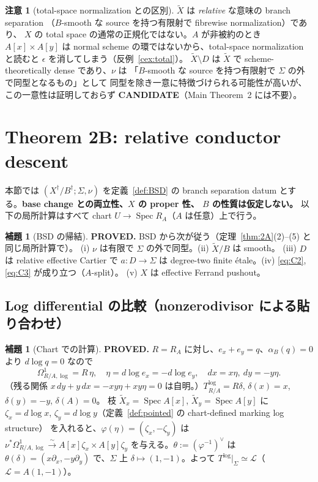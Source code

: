 \documentclass[11pt,a4paper]{article}
\numberwithin{equation}{section}
\theoremstyle{definition}
\newtheorem{lemma}[definition]{補題}
\newtheorem{remark}[definition]{注意}
\newcommand{\tX}{\widetilde X}
\newcommand{\LL}{\mathcal L}
\begin{document}
\begin{remark}[total-space normalization との区別]\label{rem:not-total-norm}
$\tX$ は \emph{relative} な意味の branch separation
（$B$-smooth な source を持つ有限射で fibrewise normalization）であり、
$X$ の total space の通常の正規化ではない。$A$ が非被約のとき
$A[x]\times A[y]$ は normal scheme の環ではないから、total-space
normalization と読むと $\epsilon$ を消してしまう（反例~\ref{cex:total}）。
\(\tX\setminus D\) は $\tX$ で scheme-theoretically dense であり、$\nu$ は
「$B$-smooth な source を持つ有限射で $\Sigma$ の外で同型となるもの」として
同型を除き一意に特徴づけられる可能性が高いが、この一意性は証明しておらず
\textbf{CANDIDATE}（Main Theorem~2 には不要）。
\end{remark}

\section{Theorem 2B: relative conductor descent}\label{sec:2B}

本節では \((X^\dagger/B^\dagger;\Sigma,\nu)\) を定義~\ref{def:BSD} の
branch separation datum とする。\textbf{base change との両立性、$X$ の proper 性、
$B$ の性質は仮定しない。} 以下の局所計算はすべて chart
$U\to\operatorname{Spec}R_A$（$A$ は任意）上で行う。

\begin{lemma}[BSD の帰結]\label{lem:BSD-conseq}
\textbf{PROVED.} BSD から次が従う（定理~\ref{thm:2A}(2)--(5) と同じ局所計算で）。
(i) $\nu$ は有限で $\Sigma$ の外で同型。(ii) $\tX/B$ は smooth。
(iii) $D$ は relative effective Cartier で $a:D\to\Sigma$ は degree-two
finite étale。(iv) \eqref{eq:C2}, \eqref{eq:C3} が成り立つ（$A$-split）。
(v) $X$ は effective Ferrand pushout。
\end{lemma}

\subsection{Log differential の比較（nonzerodivisor による貼り合わせ）}

\begin{lemma}[Chart での計算]\label{lem:chart-log}
\textbf{PROVED.} $R=R_A$ に対し、$e_x+e_y=q$、$\alpha_B(q)=0$ より
$d\log q=0$ なので
\[
  \Omega^1_{R/A,\log}=R\,\eta,\quad
  \eta=d\log e_x=-d\log e_y,\quad dx=x\eta,\ dy=-y\eta .
\]
（残る関係 $x\,dy+y\,dx=-xy\eta+xy\eta=0$ は自明。）$T^{\log}_{R/A}=R\delta$,
$\delta(x)=x$, $\delta(y)=-y$, $\delta(A)=0$。
枝 $\tX_x=\operatorname{Spec}A[x]$, $\tX_y=\operatorname{Spec}A[y]$ に
$\zeta_x=d\log x$, $\zeta_y=d\log y$（定義~\ref{def:pointed} の
chart-defined marking log structure）
を入れると、$\varphi(\eta)=(\zeta_x,-\zeta_y)$ は
$\nu^*\Omega^1_{R/A,\log}\xrightarrow{\sim}A[x]\zeta_x\times A[y]\zeta_y$
を与える。$\theta:=(\varphi^{-1})^\vee$ は $\theta(\delta)=(x\partial_x,-y\partial_y)$
で、$\Sigma$ 上 $\delta\mapsto(1,-1)$。よって
$T^{\log}|_\Sigma\simeq\LL$（$\LL=A(1,-1)$）。
\end{lemma}
\end{document}
